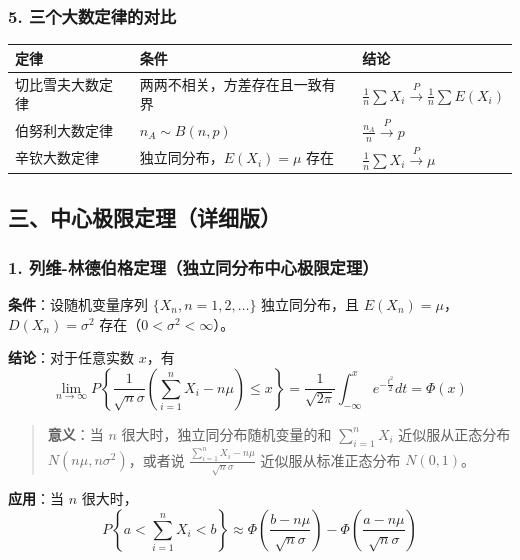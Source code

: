 \documentclass[12pt,a4paper]{ctexart}
\newenvironment{myquote}
  {\par\vspace{0.5em}\begin{quote}\sffamily\color{gray}}
  {\end{quote}\vspace{0.5em}}
\begin{document}
\subsubsection{5. 三个大数定律的对比}
\begin{center}
    \begin{tabular}{@{}p{3cm}p{6cm}p{4cm}@{}}
        \toprule
        \textbf{定律} & \textbf{条件}             & \textbf{结论}                                                  \\
        \midrule
        切比雪夫大数定律    & 两两不相关，方差存在且一致有界         & $\frac{1}{n}\sum X_i \xrightarrow{P} \frac{1}{n}\sum E(X_i)$ \\
        伯努利大数定律     & $n_A \sim B(n, p)$      & $\frac{n_A}{n} \xrightarrow{P} p$                            \\
        辛钦大数定律      & 独立同分布，$E(X_i) = \mu$ 存在 & $\frac{1}{n}\sum X_i \xrightarrow{P} \mu$                    \\
        \bottomrule
    \end{tabular}
\end{center}

\subsection{三、中心极限定理（详细版）}

\subsubsection{1. 列维-林德伯格定理（独立同分布中心极限定理）}
\textbf{条件}：设随机变量序列 $\{X_n, n = 1, 2, \dots\}$ 独立同分布，且 $E(X_n) = \mu$，$D(X_n) = \sigma^2$ 存在（$0 < \sigma^2 < \infty$）。

\textbf{结论}：对于任意实数 $x$，有
\[
    \lim_{n \to \infty} P\left\{\frac{1}{\sqrt{n}\sigma} \left(\sum_{i=1}^n X_i - n\mu\right) \le x\right\} = \frac{1}{\sqrt{2\pi}} \int_{-\infty}^x e^{-\frac{t^2}{2}} dt = \Phi(x)
\]

\begin{myquote}
    \textbf{意义}：当 $n$ 很大时，独立同分布随机变量的和 $\sum_{i=1}^n X_i$ 近似服从正态分布 $N(n\mu, n\sigma^2)$，或者说 $\frac{\sum_{i=1}^n X_i - n\mu}{\sqrt{n}\sigma}$ 近似服从标准正态分布 $N(0, 1)$。
\end{myquote}

\textbf{应用}：当 $n$ 很大时，
\[
    P\left\{a < \sum_{i=1}^n X_i < b\right\} \approx \Phi\left(\frac{b - n\mu}{\sqrt{n}\sigma}\right) - \Phi\left(\frac{a - n\mu}{\sqrt{n}\sigma}\right)
\]
\end{document}

